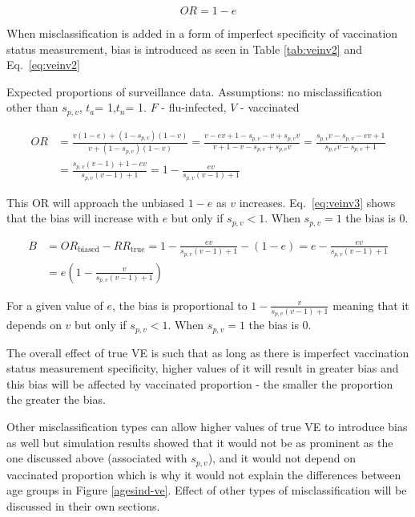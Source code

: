 \documentclass[11pt]{article}
\begin{document}
\begin{equation} \label{eq:veinv1}
OR = 1-e
\end{equation}

When misclassification is added in a form of imperfect specificity of vaccination status measurement, bias is introduced as seen in Table \ref{tab:veinv2} and Eq.\ \ref{eq:veinv2}

\begin{table}[h]
\centering
\caption{
Expected proportions of surveillance data. Assumptions: no misclassification other than $s_{p,v}$, $t_a$= 1,$t_n$= 1.
$F$ - flu-infected, $V$ - vaccinated
 \label{tab:veinv2}
}
	
\end{table}

\begin{equation} \label{eq:veinv2}
\begin{aligned}
OR &= \frac{v(1-e)+(1-s_{p,v})(1-v)}{v+(1-s_{p,v})(1-v)} =  \frac{v-ev+1-s_{p,v}-v+s_{p,v}v}{v+1-v-s_{p,v}+s_{p,v}v} =  
	\frac{s_{p,v}v-s_{p,v}-ev+1}{s_{p,v}v-s_{p,v}+1} \\
	&= \frac{s_{p,v}(v-1)+1-ev}{s_{p,v}(v-1)+1} = 1 - \frac{ev}{s_{p,v}(v-1)+1}
\end{aligned}
\end{equation}

This OR will approach the unbiased $1-e$ as $v$ increases. Eq.\ \ref{eq:veinv3} shows that the bias will increase with $e$ but only if $s_{p,v}<1$. When $s_{p,v}=1$ the bias is 0.

\begin{equation} \label{eq:veinv3}
\begin{aligned}
B &= OR_{\text{biased}} - RR_{\text{true}} = 1 - \frac{ev}{s_{p,v}(v-1)+1} - (1-e) = e - \frac{ev}{s_{p,v}(v-1)+1} \\
	&= e(1 - \frac{v}{s_{p,v}(v-1)+1})
\end{aligned}
\end{equation}

For a given value of $e$, the bias is proportional to $1 - \frac{v}{s_{p,v}(v-1)+1}$ meaning that it depends on $v$ but only if $s_{p,v}<1$. When $s_{p,v}=1$ the bias is 0.

The overall effect of true VE is such that as long as there is imperfect vaccination status measurement specificity, higher values of it will result in greater bias and this bias will be affected by vaccinated proportion - the smaller the proportion the greater the bias. 

Other misclassification types can allow higher values of true VE to introduce bias as well but simulation results showed that it would not be as prominent as the one discussed above (associated with $s_{p,v}$), and it would not depend on vaccinated proportion which is why it would not explain the differences between age groups in Figure \ref{agesind-ve}. Effect of other types of misclassification will be discussed in their own sections.
\end{document}
